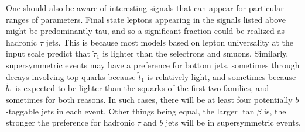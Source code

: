 \documentclass[11pt]{article}
\def\stilde{\widetilde}
\begin{document}
One should also be aware of interesting signals that can appear for particular ranges of 
parameters. Final state leptons appearing in the signals listed above might be 
predominantly tau, and so a significant fraction could be realized as hadronic $\tau$ jets. 
This is because most models based on lepton universality at the input scale 
predict that $\stilde \tau_1$ is lighter than the selectrons 
and smuons. Similarly, supersymmetric events may have a preference for bottom jets, 
sometimes through decays involving top quarks because $\stilde t_1$ is relatively light, 
and sometimes because $\stilde b_1$ is expected to be lighter than the squarks of the first 
two families, and sometimes for both reasons. In such cases, there will be at least four 
potentially $b$-taggable jets in each event. Other things being equal, the larger 
$\tan\beta$ is, the stronger the preference for hadronic $\tau$ and $b$ jets will be in 
supersymmetric events.
\end{document}

